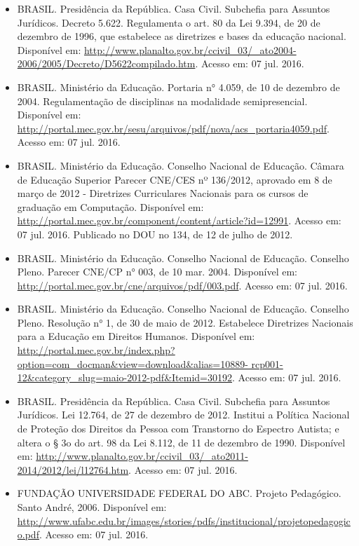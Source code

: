 \begin{itemize}
	\item BRASIL. Presidência da República. Casa Civil. Subchefia para Assuntos Jurídicos. Decreto 5.622. Regulamenta o art. 80 da Lei 9.394, de 20 de dezembro de 1996, que estabelece as diretrizes e bases da educação nacional. Disponível em: \url{http://www.planalto.gov.br/ccivil_03/_ato2004-2006/2005/Decreto/D5622compilado.htm}. Acesso em: 07 jul. 2016.
	
	\item BRASIL. Ministério da Educação. Portaria n° 4.059, de 10 de dezembro de 2004. Regulamentação de disciplinas na modalidade semipresencial. Disponível em: \url{http://portal.mec.gov.br/sesu/arquivos/pdf/nova/acs_portaria4059.pdf}. Acesso em: 07 jul. 2016.
	
	\item BRASIL. Ministério da Educação. Conselho Nacional de Educação. Câmara de Educação Superior Parecer CNE/CES nº 136/2012, aprovado em 8 de março de 2012 - Diretrizes Curriculares Nacionais para os cursos de graduação em Computação. Disponível em: \url{http://portal.mec.gov.br/component/content/article?id=12991}. Acesso em: 07 jul. 2016. Publicado no DOU no 134, de 12 de julho de 2012.
	
	\item BRASIL. Ministério da Educação. Conselho Nacional de Educação. Conselho Pleno. Parecer CNE/CP n° 003, de 10 mar. 2004. Disponível em:
	\url{http://portal.mec.gov.br/cne/arquivos/pdf/003.pdf}. Acesso em: 07 jul. 2016.
	
	\item BRASIL. Ministério da Educação. Conselho Nacional de Educação. Conselho Pleno. Resolução n° 1, de 30 de maio de 2012. Estabelece Diretrizes Nacionais para a Educação em Direitos Humanos. Disponível em: \url{http://portal.mec.gov.br/index.php?option=com_docman&view=download&alias=10889-
		rcp001-12&category_slug=maio-2012-pdf&Itemid=30192}. Acesso em: 07 jul. 2016.
	
	\item BRASIL. Presidência da República. Casa Civil. Subchefia para Assuntos Jurídicos. Lei 12.764, de 27 de dezembro de 2012. Institui a Política Nacional de Proteção dos Direitos da Pessoa com Transtorno do Espectro Autista; e altera o § 3o do art. 98 da Lei 8.112, de 11 de dezembro de 1990. Disponível em: \url{http://www.planalto.gov.br/ccivil_03/_ato2011-2014/2012/lei/l12764.htm}. Acesso em: 07 jul. 2016.
	
	\item FUNDAÇÃO UNIVERSIDADE FEDERAL DO ABC. Projeto Pedagógico. Santo André,
	2006. Disponível em: \url{http://www.ufabc.edu.br/images/stories/pdfs/institucional/projetopedagogico.pdf}. Acesso em: 07 jul. 2016.
	

\end{itemize}
